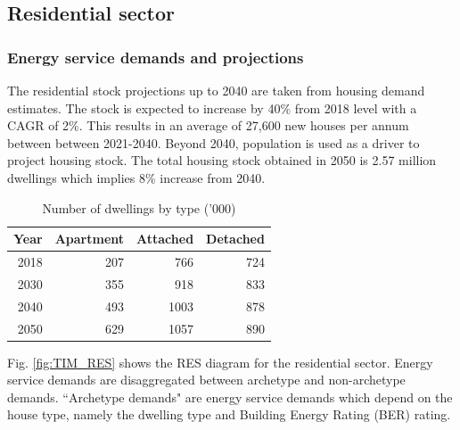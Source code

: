 \documentclass[gmd,manuscript]{copernicus}
\begin{document}
\clearpage

\subsection{Residential sector}
\label{ss:residential}
\subsubsection{Energy service demands and projections}

The residential stock projections up to 2040 are taken from \citet{Bergin2020} housing demand estimates. The stock is expected to increase by 40\% from 2018 level with a CAGR of 2\%. This results in an average of 27,600 new houses per annum between between 2021-2040. Beyond 2040, population is used as a driver to project housing stock. The total housing stock obtained in 2050 is 2.57 million dwellings which implies 8\% increase from 2040. 

\begin{table}[htbp]
  \centering
  \footnotesize
  \caption{Number of dwellings by type ('000)}
    \begin{tabular}{rrrr}
    \hline
    \multicolumn{1}{l}{Year} & \multicolumn{1}{l}{Apartment} & \multicolumn{1}{l}{Attached } & \multicolumn{1}{l}{Detached} \\ \hline
    2018  & 207   & 766   & 724 \\
    2030  & 355   & 918   & 833 \\
    2040  & 493   & 1003  & 878 \\
    2050  & 629   & 1057  & 890 \\ \hline
    \end{tabular}%
  \label{table: number of dwellings by type}%
\end{table}%


Fig. \ref{fig:TIM_RES} shows the RES diagram for the residential sector. Energy service demands are disaggregated between archetype and non-archetype demands. ``Archetype demands" are energy service demands which depend on the house type, namely the dwelling type and Building Energy Rating (BER) rating. 
 
\end{document}

